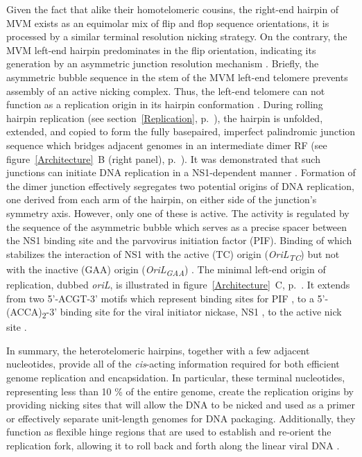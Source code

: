 Given the fact that alike their homotelomeric cousins, the right-end hairpin of MVM exists as an equimolar mix of flip and flop sequence orientations, it is processed by a similar terminal resolution nicking strategy. On the contrary, the MVM left-end hairpin predominates in the flip orientation, indicating its generation by an asymmetric junction resolution mechanism \cite{pmid12743281}. Briefly, the asymmetric bubble sequence in the stem of the MVM left-end telomere prevents assembly of an active nicking complex. Thus, the left-end telomere can not function as a replication origin in its hairpin conformation \cite{pmid8995615}. During rolling hairpin replication (see section~\ref{Replication}, p.~\pageref{Replication}), the hairpin is unfolded, extended, and copied to form the fully basepaired, imperfect palindromic junction sequence which bridges adjacent genomes in an intermediate dimer RF (see figure~\ref{Architecture}~B (right panel), p.~\pageref{Architecture}). It was demonstrated that such junctions can initiate DNA replication in a NS1-dependent manner \cite{pmid8076610, pmid1530771}. Formation of the dimer junction effectively segregates two potential origins of DNA replication, one derived from each arm of the hairpin, on either side of the junction's symmetry axis. However, only one of these is active. The activity is regulated by the sequence of the asymmetric bubble which serves as a precise spacer between the NS1 binding site and the parvovirus initiation factor (PIF). Binding of which stabilizes the interaction of NS1 with the active (TC) origin (\textit{OriL\textsubscript{TC}}) but not with the inactive (GAA) origin (\textit{OriL\textsubscript{GAA}}) \cite{pmid11435581}. The minimal left-end origin of replication, dubbed \textit{oriL}, is illustrated in figure~\ref{Architecture}~C, p.~\pageref{Architecture}. It extends from two 5'-ACGT-3' motifs which represent binding sites for PIF \cite{pmid8995666, pmid9223459, pmid10523663}, to a 5'-(ACCA)\textsubscript{2}-3' binding site for the viral initiator nickase, NS1 \cite{pmid7853501}, to the active nick site \cite{pmid8076610}.

In summary, the heterotelomeric hairpins, together with a few adjacent nucleotides, provide all of the \textit{cis}-acting information required for both efficient genome replication and encapsidation. In particular, these terminal nucleotides, representing less than 10 \% of the entire genome, create the replication origins by providing nicking sites that will allow the DNA to be nicked and used as a primer or effectively separate unit-length genomes for DNA packaging. Additionally, they function as flexible hinge regions that are used to establish and re-orient the replication fork, allowing it to roll back and forth along the linear viral DNA \cite{telomere2, telomere3, handbook, RHR}.        

